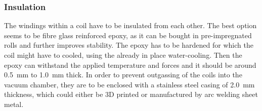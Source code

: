 \subsubsection{Insulation}
The windings within a coil have to be insulated from each other.
The best option seems to be fibre glass reinforced epoxy, as it can be bought in pre-impregnated rolls and further improves stability.
The epoxy has to be hardened for which the coil might have to cooled, using the already in place water-cooling.
Then the epoxy can withstand the applied temperature and forces and it should be around \SI{0.5}{mm} to \SI{1.0}{mm} thick.
In order to prevent outgassing of the coils into the vacuum chamber, they are to be enclosed with a stainless steel casing of \SI{2.0}{mm} thickness, which could either be 3D printed or manufactured by arc welding sheet metal.\\

